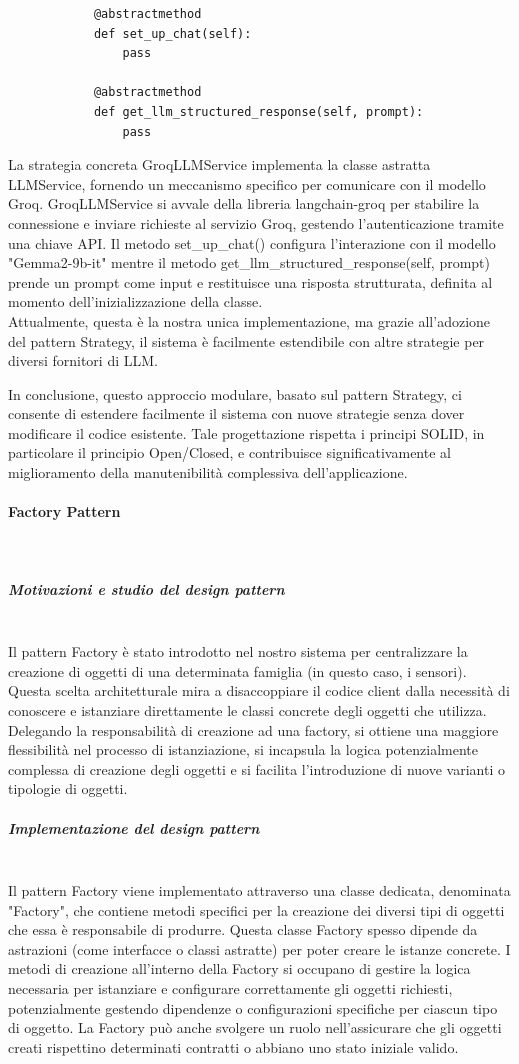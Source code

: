 \documentclass[10pt]{article}
\newcommand{\myparagraph}[1]{\paragraph{#1}\mbox{}\\}
\newcommand{\mysubparagraph}[1]{\subparagraph{#1}\mbox{}\\}
\begin{document}
\begin{itemize}
\begin{lstlisting}
            @abstractmethod
            def set_up_chat(self):
                pass

            @abstractmethod
            def get_llm_structured_response(self, prompt):
                pass
        \end{lstlisting}
        La strategia concreta GroqLLMService implementa la classe astratta LLMService, fornendo un meccanismo specifico per comunicare con il modello Groq. GroqLLMService si avvale della libreria langchain-groq per stabilire la connessione e inviare richieste al servizio Groq, gestendo l'autenticazione tramite una chiave API. Il metodo set\_up\_chat() configura l'interazione con il modello "Gemma2-9b-it" mentre il metodo get\_llm\_structured\_response(self, prompt) prende un prompt come input e restituisce una risposta strutturata, definita al momento dell'inizializzazione della classe.\\
        Attualmente, questa è la nostra unica implementazione, ma grazie all'adozione del pattern Strategy, il sistema è facilmente estendibile con altre strategie per diversi fornitori di LLM.

    \end{itemize}
    In conclusione, questo approccio modulare, basato sul pattern Strategy, ci consente di estendere facilmente il sistema con nuove strategie senza dover modificare il codice esistente. Tale progettazione rispetta i principi SOLID, in particolare il principio Open/Closed, e contribuisce significativamente al miglioramento della manutenibilità complessiva dell'applicazione.

\myparagraph{Factory Pattern}

    \mysubparagraph{Motivazioni e studio del design pattern}
    Il pattern Factory è stato introdotto nel nostro sistema per centralizzare la creazione di oggetti di una determinata famiglia (in questo caso, i sensori). Questa scelta architetturale mira a disaccoppiare il codice client dalla necessità di conoscere e istanziare direttamente le classi concrete degli oggetti che utilizza. Delegando la responsabilità di creazione ad una factory, si ottiene una maggiore flessibilità nel processo di istanziazione, si incapsula la logica potenzialmente complessa di creazione degli oggetti e si facilita l'introduzione di nuove varianti o tipologie di oggetti.

    \mysubparagraph{Implementazione del design pattern}
    Il pattern Factory viene implementato attraverso una classe dedicata, denominata "Factory", che contiene metodi specifici per la creazione dei diversi tipi di oggetti che essa è responsabile di produrre. Questa classe Factory spesso dipende da astrazioni (come interfacce o classi astratte) per poter creare le istanze concrete. I metodi di creazione all'interno della Factory si occupano di gestire la logica necessaria per istanziare e configurare correttamente gli oggetti richiesti, potenzialmente gestendo dipendenze o configurazioni specifiche per ciascun tipo di oggetto. La Factory può anche svolgere un ruolo nell'assicurare che gli oggetti creati rispettino determinati contratti o abbiano uno stato iniziale valido.
\end{document}
